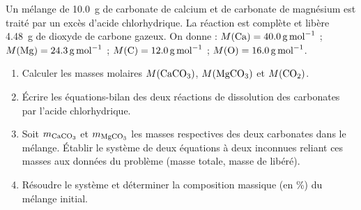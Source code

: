 \documentclass[11pt]{article}
\begin{document}
\begin{exercice}
Un mélange de \SI{10,0}{\gram} de carbonate de calcium  et de carbonate de magnésium  est traité par un excès d'acide chlorhydrique. La réaction est complète et libère \SI{4,48}{\gram} de dioxyde de carbone  gazeux. On donne : $M(\ce{Ca}) = \SI{40,0}{\gram\per\mole}$ ; $M(\ce{Mg}) = \SI{24,3}{\gram\per\mole}$ ; $M(\ce{C}) = \SI{12,0}{\gram\per\mole}$ ; $M(\ce{O}) = \SI{16,0}{\gram\per\mole}$.
\begin{enumerate}
    \item Calculer les masses molaires $M(\ce{CaCO3})$, $M(\ce{MgCO3})$ et $M(\ce{CO2})$.
    \item Écrire les équations-bilan des deux réactions de dissolution des carbonates par l'acide chlorhydrique.
    \item Soit $m_{\ce{CaCO3}}$ et $m_{\ce{MgCO3}}$ les masses respectives des deux carbonates dans le mélange. Établir le système de deux équations à deux inconnues reliant ces masses aux données du problème (masse totale, masse de  libéré).
    \item Résoudre le système et déterminer la composition massique (en \%) du mélange initial.
\end{enumerate}
\end{exercice}

\end{document}
